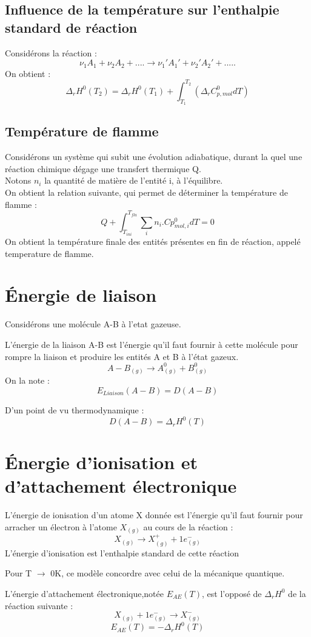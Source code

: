 \section{Influence de la température sur l'enthalpie standard de réaction}
Considérons la réaction :
$$\nu_1A_1 + \nu_2A_2 + .... \rightarrow \nu_1'A_1' + \nu_2'A_2' + .....$$
On obtient :
$$\Delta_r H^0(T_2) = \Delta_r H^0(T_1) + \int_{T_1}^{T_2} (\Delta_r C_{p,mol}^0dT)$$
\section{Température de flamme}
Considérons un système qui subit une évolution adiabatique, durant la quel une réaction chimique dégage une transfert thermique Q.\\
Notons $n_i$ la quantité de matière de l'entité i, à l'équilibre.\\
On obtient la relation suivante, qui permet de déterminer la température de flamme : 
$$Q + \int_{T_{ini}}^{T_{fla}} \sum_i n_i.Cp_{mol,i}^0 dT = 0$$
On obtient la température finale des entités présentes en fin de réaction, appelé temperature de flamme.
\chapter{Énergie de liaison}
Considérons une molécule A-B à l'etat gazeuse.
\begin{de}
 L'énergie de la liaison A-B est l'énergie qu'il faut fournir à cette molécule pour rompre la liaison et produire les entités A et B à l'état gazeux.
$$A-B_{(g)} \rightarrow A_{(g)}^0 + B_{(g)}^0$$
On la note :
$$E_{Liaison}(A-B)=D(A-B)$$
\end{de}
D'un point de vu thermodynamique : 
$$D(A-B)=\Delta_r H^0 (T)$$
\chapter{Énergie d'ionisation et d'attachement électronique}
\begin{de}
 L'énergie de ionisation d'un atome X donnée est l'énergie qu'il faut fournir pour arracher un électron à l'atome $X_{(g)}$ au cours de la réaction :
$$X_{(g)} \rightarrow X^+_{(g)}+1e^-_{(g)}$$
L'énergie d'ionisation est l'enthalpie standard de cette réaction
\end{de}
Pour T $\rightarrow$ 0K, ce modèle concordre avec celui de la mécanique quantique.
\begin{de}
 L'énergie d'attachement électronique,notée $E_{AE}(T)$, est l'opposé de $\Delta_r H^0$ de la réaction suivante :
$$X_{(g)} + 1e_{(g)}^- \rightarrow X_{(g)}^-$$
$$E_{AE}(T) = -\Delta_r H^0(T)$$
\end{de}
